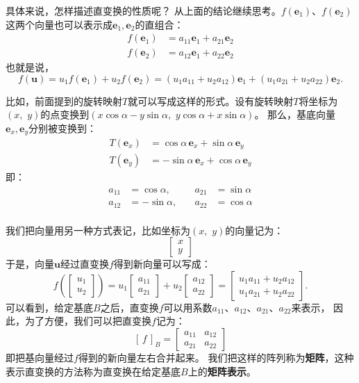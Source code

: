 \documentclass[12pt,UTF8]{ctexbook}
\begin{document}
具体来说，怎样描述直变换的性质呢？
从上面的结论继续思考。$f(\mathbf{e}_1)$、$f(\mathbf{e}_2)$这两个向量也可以表示成$\mathbf{e}_1, \mathbf{e}_2$的直组合：
\begin{align*}
    f(\mathbf{e}_1) &= a_{11} \mathbf{e}_1 + a_{21} \mathbf{e}_2  \\
    f(\mathbf{e}_2) &= a_{12} \mathbf{e}_1 + a_{22} \mathbf{e}_2 
\end{align*}
也就是说，
$$ f(\mathbf{u}) = u_1 f(\mathbf{e}_1) + u_2 f(\mathbf{e}_2) = (u_1a_{11} + u_2a_{12}) \mathbf{e}_1 + (u_1a_{21} + u_2a_{22}) \mathbf{e}_2.$$

比如，前面提到的旋转映射$T$就可以写成这样的形式。设有旋转映射$T$将坐标为$(x,\,\, y)$的点变换到$(x\cos{\alpha} - y\sin{\alpha},\,\,y\cos{\alpha} + x\sin{\alpha})$。
那么，基底向量$\mathbf{e}_x, \mathbf{e}_y$分别被变换到：
\begin{align*}
    T(\mathbf{e}_x) &= \cos{\alpha}\,\mathbf{e}_x + \sin{\alpha}\,\mathbf{e}_y  \\
    T(\mathbf{e}_y) &= -\sin{\alpha}\,\mathbf{e}_x + \cos{\alpha}\,\mathbf{e}_y  
\end{align*}
即：
$$
\begin{array}{rlrl}
    a_{11} &= \cos{\alpha}, \quad & a_{21} &= \sin{\alpha} \\
    a_{12} &= -\sin{\alpha}, \quad & a_{22} &= \cos{\alpha} \\
\end{array}
$$

我们把向量用另一种方式表记，比如坐标为$(x, \,\,y)$的向量记为：
$$ \begin{bmatrix}
    x\\ y
\end{bmatrix}$$
于是，向量$\mathbf{u}$经过直变换$f$得到新向量可以写成：
$$ f\left(\begin{bmatrix}
    u_1\\ u_2
\end{bmatrix}\right) = u_1\begin{bmatrix}
    a_{11}\\ a_{21}
\end{bmatrix} + u_2 \begin{bmatrix}
    a_{12}\\ a_{22}
\end{bmatrix} = \begin{bmatrix}
    u_1a_{11} + u_2a_{12}\\ u_1a_{21} + u_2a_{22} 
\end{bmatrix}.$$
可以看到，给定基底$B$之后，直变换$f$可以用系数$a_{11}$、$a_{12}$、$a_{21}$、$a_{22}$来表示，
因此，为了方便，我们可以把直变换$f$记为：
$$
[\,f\,]_B = 
\begin{bmatrix}
    a_{11} & a_{12} \\ a_{21} & a_{22}
\end{bmatrix}
$$
即把基向量经过$f$得到的新向量左右合并起来。
我们把这样的阵列称为\textbf{矩阵}，这种表示直变换的方法称为直变换在给定基底$B$上的\textbf{矩阵表示}。
\end{document}
